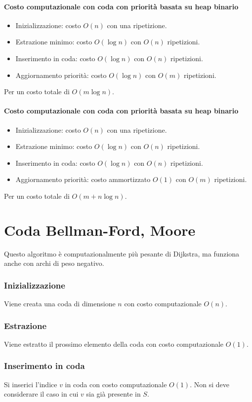 	\paragraph{Costo computazionale con coda con priorit\`a basata su heap binario}
	\begin{itemize}
		\item Inizializzazione: costo $O(n)$ con una ripetizione.
		\item Estrazione minimo: costo $O(\log n)$ con $O(n)$ ripetizioni.
		\item Inserimento in coda: costo $O(\log n)$ con $O(n)$ ripetizioni.
		\item Aggiornamento priorit\`a: costo $O(\log n)$ con $O(m)$ ripetizioni.
	\end{itemize}
	Per un costo totale di $O(m\log n)$.
	\paragraph{Costo computazionale con coda con priorit\`a basata su heap binario}
	\begin{itemize}
		\item Inizializzazione: costo $O(n)$ con una ripetizione.
		\item Estrazione minimo: costo $O(\log n)$ con $O(n)$ ripetizioni.
		\item Inserimento in coda: costo $O(\log n)$ con $O(n)$ ripetizioni.
		\item Aggiornamento priorit\`a: costo ammortizzato $O(1)$ con $O(m)$ ripetizioni.
	\end{itemize}
	Per un costo totale di $O(m+n\log n)$.
\section{Coda Bellman-Ford, Moore}
	Questo algoritmo \`e computazionalmente pi\`u pesante di Dijkstra, ma funziona anche con archi di
	peso negativo.
	\subsubsection{Inizializzazione}
	Viene creata una coda di dimensione $n$ con costo computazionale $O(n)$.
	\subsubsection{Estrazione}
	Viene estratto il prossimo elemento della coda con costo computazionale $O(1)$.
	\subsubsection{Inserimento in coda}
	Si inserici l'indice $v$ in coda con costo computazionale $O(1)$. Non si deve considerare il caso
	in cui $v$ sia gi\`a presente in $S$.
